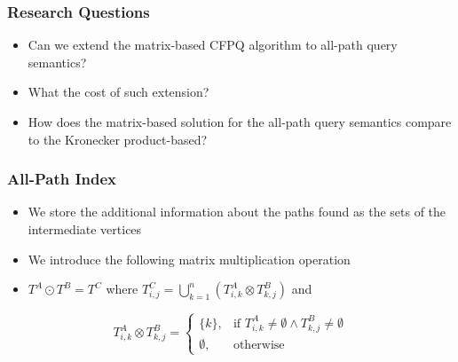 \documentclass[xcolor=table,aspectratio=169]{beamer}
\begin{document}
\begin{frame}[fragile] \frametitle{Research Questions}
\begin{itemize}
	\item Can we extend the matrix-based CFPQ algorithm to all-path query semantics?
	\item What the cost of such extension?
	\item How does the matrix-based solution for the all-path query semantics compare to the Kronecker product-based?
\end{itemize}
\end{frame}

\begin{frame}[fragile] \frametitle{All-Path Index}
\begin{itemize}
	\item We store the additional information about the paths found as the sets of the intermediate vertices
	\item We introduce the following matrix multiplication operation
	\item $T^A \odot T^B = T^C$ where $T^C_{i,j} = \bigcup^{n}_{k = 1} (T^A_{i,k} \otimes T^B_{k,j})$ and  
\end{itemize}
$$T^A_{i,k} \otimes T^B_{k,j} = \begin{cases} \{k\}, & \mbox{if } T^A_{i,k} \neq \emptyset \wedge T^B_{k,j} \neq \emptyset \\ \emptyset, & \mbox{otherwise} \end{cases}$$
\end{frame}

 



%  	
%  	
\end{document}
